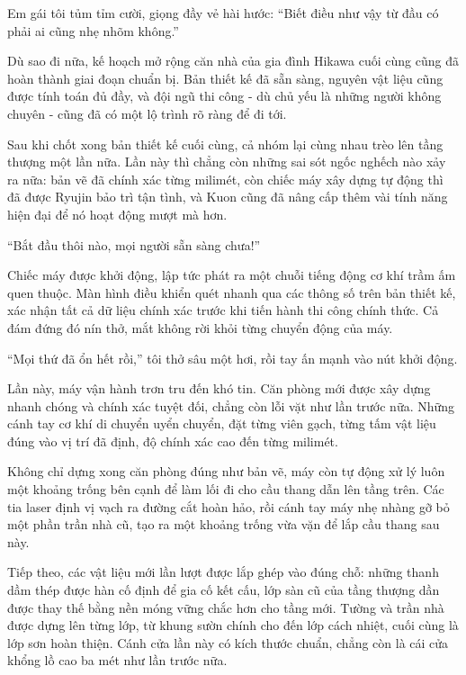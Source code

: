 \documentclass[../main.tex]{subfiles}
\begin{document}
Em gái tôi tủm tỉm cười, giọng đầy vẻ hài hước: ``Biết điều như vậy từ đầu có phải ai cũng nhẹ nhõm không.''

Dù sao đi nữa, kế hoạch mở rộng căn nhà của gia đình Hikawa cuối cùng cũng đã hoàn thành giai đoạn chuẩn bị. Bản thiết kế đã sẵn sàng, nguyên vật liệu cũng được tính toán đủ đầy, và đội ngũ thi công - dù chủ yếu là những người không chuyên - cũng đã có một lộ trình rõ ràng để đi tới.

\ct

Sau khi chốt xong bản thiết kế cuối cùng, cả nhóm lại cùng nhau trèo lên tầng thượng một lần nữa. Lần này thì chẳng còn những sai sót ngốc nghếch nào xảy ra nữa: bản vẽ đã chính xác từng milimét, còn chiếc máy xây dựng tự động thì đã được Ryujin bảo trì tận tình, và Kuon cũng đã nâng cấp thêm vài tính năng hiện đại để nó hoạt động mượt mà hơn.

``Bắt đầu thôi nào, mọi người sẵn sàng chưa!''

Chiếc máy được khởi động, lập tức phát ra một chuỗi tiếng động cơ khí trầm ấm quen thuộc. Màn hình điều khiển quét nhanh qua các thông số trên bản thiết kế, xác nhận tất cả dữ liệu chính xác trước khi tiến hành thi công chính thức. Cả đám đứng đó nín thở, mắt không rời khỏi từng chuyển động của máy.

``Mọi thứ đã ổn hết rồi,'' tôi thở sâu một hơi, rồi tay ấn mạnh vào nút khởi động.

Lần này, máy vận hành trơn tru đến khó tin. Căn phòng mới được xây dựng nhanh chóng và chính xác tuyệt đối, chẳng còn lỗi vặt như lần trước nữa. Những cánh tay cơ khí di chuyển uyển chuyển, đặt từng viên gạch, từng tấm vật liệu đúng vào vị trí đã định, độ chính xác cao đến từng milimét.

Không chỉ dựng xong căn phòng đúng như bản vẽ, máy còn tự động xử lý luôn một khoảng trống bên cạnh để làm lối đi cho cầu thang dẫn lên tầng trên. Các tia laser định vị vạch ra đường cắt hoàn hảo, rồi cánh tay máy nhẹ nhàng gỡ bỏ một phần trần nhà cũ, tạo ra một khoảng trống vừa vặn để lắp cầu thang sau này.

Tiếp theo, các vật liệu mới lần lượt được lắp ghép vào đúng chỗ: những thanh dầm thép được hàn cố định để gia cố kết cấu, lớp sàn cũ của tầng thượng dần được thay thế bằng nền móng vững chắc hơn cho tầng mới. Tường và trần nhà được dựng lên từng lớp, từ khung sườn chính cho đến lớp cách nhiệt, cuối cùng là lớp sơn hoàn thiện. Cánh cửa lần này có kích thước chuẩn, chẳng còn là cái cửa khổng lồ cao ba mét như lần trước nữa.
\end{document}
